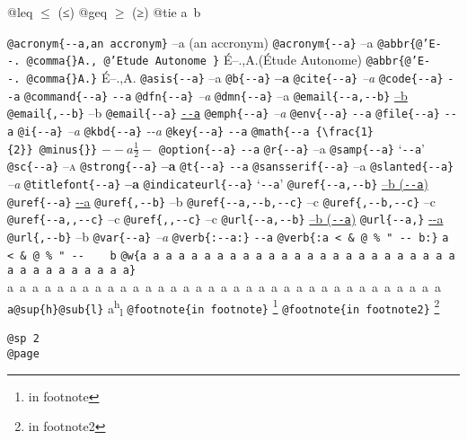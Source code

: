 \documentclass{book}
\newcommand\Texinfocommandstyletextcite[1]{{\normalfont{}\textsl{#1}}}%
\newcommand\Texinfocommandstyletextkbd[1]{{\ttfamily\textsl{#1}}}%
\newcommand\Texinfocommandstyletextvar[1]{{\normalfont{}\textsl{#1}}}%
\renewcommand{\_}{\Texinfounderscore\discretionary{}{}{}}
\begin{document}
@leq $\leq{}$ (≤)
@geq $\geq{}$ (≥)
@tie a~b

\texttt{@acronym\{{-}{-}a,an accronym\}} --a (an accronym)
\texttt{@acronym\{{-}{-}a\}} --a
\texttt{@abbr\{@'E{-}{-}.\ @comma\{\}A.,\ @'Etude Autonome \}} \'{E}--.\@ ,A.\@ (\'{E}tude Autonome)
\texttt{@abbr\{@'E{-}{-}.\ @comma\{\}A.\}} \'{E}--.\@ ,A.\@
\texttt{@asis\{{-}{-}a\}} --a
\texttt{@b\{{-}{-}a\}} \textbf{--a}
\texttt{@cite\{{-}{-}a\}} \Texinfocommandstyletextcite{--a}
\texttt{@code\{{-}{-}a\}} \texttt{{-}{-}a}
\texttt{@command\{{-}{-}a\}} \texttt{{-}{-}a}
\texttt{@dfn\{{-}{-}a\}} \textsl{--a}
\texttt{@dmn\{{-}{-}a\}} \thinspace --a
\texttt{@email\{{-}{-}a,{-}{-}b\}} \href{mailto:--a}{--b}
\texttt{@email\{,{-}{-}b\}} --b
\texttt{@email\{{-}{-}a\}} \href{mailto:--a}{\nolinkurl{--a}}
\texttt{@emph\{{-}{-}a\}} \emph{--a}
\texttt{@env\{{-}{-}a\}} \texttt{{-}{-}a}
\texttt{@file\{{-}{-}a\}} \texttt{{-}{-}a}
\texttt{@i\{{-}{-}a\}} \textit{--a}
\texttt{@kbd\{{-}{-}a\}} \Texinfocommandstyletextkbd{{-}{-}a}
\texttt{@key\{{-}{-}a\}} \texttt{{-}{-}a}
\texttt{@math\{{-}{-}a \{\textbackslash{}frac\{1\}\{2\}\}\ @minus\{\}\}} $--a {\frac{1}{2}} -$
\texttt{@option\{{-}{-}a\}} \texttt{{-}{-}a}
\texttt{@r\{{-}{-}a\}} \textnormal{--a}
\texttt{@samp\{{-}{-}a\}} `\texttt{{-}{-}a}'
\texttt{@sc\{{-}{-}a\}} \textsc{--a}
\texttt{@strong\{{-}{-}a\}} \textbf{--a}
\texttt{@t\{{-}{-}a\}} \texttt{{-}{-}a}
\texttt{@sansserif\{{-}{-}a\}} \textsf{--a}
\texttt{@slanted\{{-}{-}a\}} \textsl{--a}
\texttt{@titlefont\{{-}{-}a\}} {\huge \bfseries --a}
\texttt{@indicateurl\{{-}{-}a\}} `\texttt{{-}{-}a}'
\texttt{@uref\{{-}{-}a,{-}{-}b\}} \href{--a}{--b (\nolinkurl{--a})}
\texttt{@uref\{{-}{-}a\}} \url{--a}
\texttt{@uref\{,{-}{-}b\}} --b
\texttt{@uref\{{-}{-}a,{-}{-}b,{-}{-}c\}} --c
\texttt{@uref\{,{-}{-}b,{-}{-}c\}} --c
\texttt{@uref\{{-}{-}a{,}{,}{-}{-}c\}} --c
\texttt{@uref\{{,}{,}{-}{-}c\}} --c
\texttt{@url\{{-}{-}a,{-}{-}b\}} \href{--a}{--b (\nolinkurl{--a})}
\texttt{@url\{{-}{-}a,\}} \url{--a}
\texttt{@url\{,{-}{-}b\}} --b
\texttt{@var\{{-}{-}a\}} \Texinfocommandstyletextvar{--a}
\texttt{@verb\{:{-}{-}a:\}} \verb:--a:
\texttt{@verb\{:a  < \& @\ \% " {-}{-}    b:\}} \verb:a  < & @ % " --    b:
\texttt{@w\{a a a a a a a a a a a a a a a a a a a a a a a a a a a a a a a a a a a\}} \hbox{a a a a a a a a a a a a a a a a a a a a a a a a a a a a a a a a a a a}
\texttt{a@sup\{h\}@sub\{l\}} a\textsuperscript{h}\textsubscript{l}
\texttt{@footnote\{in footnote\}} \footnote{in footnote}
\texttt{@footnote\{in footnote2\}} \footnote{in footnote2}

\texttt{@sp 2}\leavevmode{}\\
\baselineskip %
\texttt{@page}\leavevmode{}\\
\newpage{}%
\phantom{blabla}%
\end{document}
